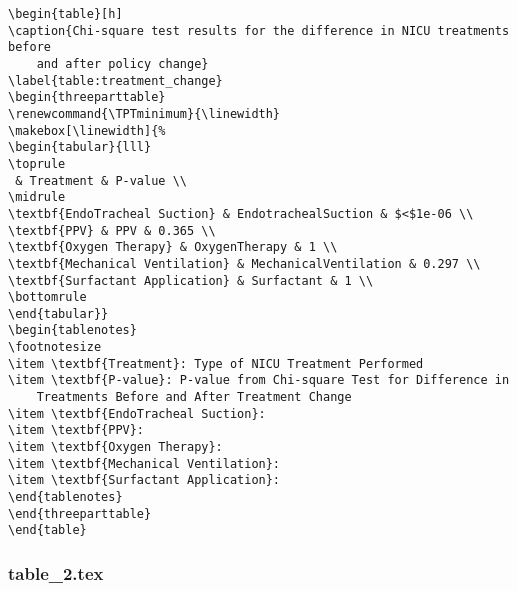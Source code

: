 \documentclass[11pt]{article}
\begin{document}
\begin{Verbatim}[tabsize=4]
\begin{table}[h]
\caption{Chi-square test results for the difference in NICU treatments before
	and after policy change}
\label{table:treatment_change}
\begin{threeparttable}
\renewcommand{\TPTminimum}{\linewidth}
\makebox[\linewidth]{%
\begin{tabular}{lll}
\toprule
 & Treatment & P-value \\
\midrule
\textbf{EndoTracheal Suction} & EndotrachealSuction & $<$1e-06 \\
\textbf{PPV} & PPV & 0.365 \\
\textbf{Oxygen Therapy} & OxygenTherapy & 1 \\
\textbf{Mechanical Ventilation} & MechanicalVentilation & 0.297 \\
\textbf{Surfactant Application} & Surfactant & 1 \\
\bottomrule
\end{tabular}}
\begin{tablenotes}
\footnotesize
\item \textbf{Treatment}: Type of NICU Treatment Performed
\item \textbf{P-value}: P-value from Chi-square Test for Difference in
	Treatments Before and After Treatment Change
\item \textbf{EndoTracheal Suction}:
\item \textbf{PPV}:
\item \textbf{Oxygen Therapy}:
\item \textbf{Mechanical Ventilation}:
\item \textbf{Surfactant Application}:
\end{tablenotes}
\end{threeparttable}
\end{table}

\end{Verbatim}

\subsubsection*{table\_2.tex}
\end{document}
